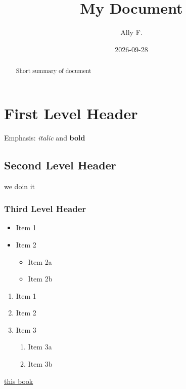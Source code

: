 \documentclass[
  letterpaper,
  DIV=11,
  numbers=noendperiod]{scrartcl}
\title{My Document}
\author{Ally F.}
\date{2026-09-28}
\providecommand{\tightlist}{%
  \setlength{\itemsep}{0pt}\setlength{\parskip}{0pt}}
\begin{document}
\maketitle
\begin{abstract}
Short summary of document
\end{abstract}


\section{First Level Header}\label{first-level-header}

Emphasis: \emph{italic} and \textbf{bold}

\subsection{Second Level Header}\label{second-level-header}

we doin it

\subsubsection{Third Level Header}\label{third-level-header}

\begin{itemize}
\tightlist
\item
  Item 1
\item
  Item 2

  \begin{itemize}
  \tightlist
  \item
    Item 2a
  \item
    Item 2b
  \end{itemize}
\end{itemize}

\begin{enumerate}
\def\labelenumi{\arabic{enumi}.}
\tightlist
\item
  Item 1
\item
  Item 2
\item
  Item 3

  \begin{enumerate}
  \def\labelenumii{\arabic{enumii}.}
  \tightlist
  \item
    Item 3a
  \item
    Item 3b
  \end{enumerate}
\end{enumerate}

\href{https://www.tellingstorieswithdata.com}{this book}
\end{document}
